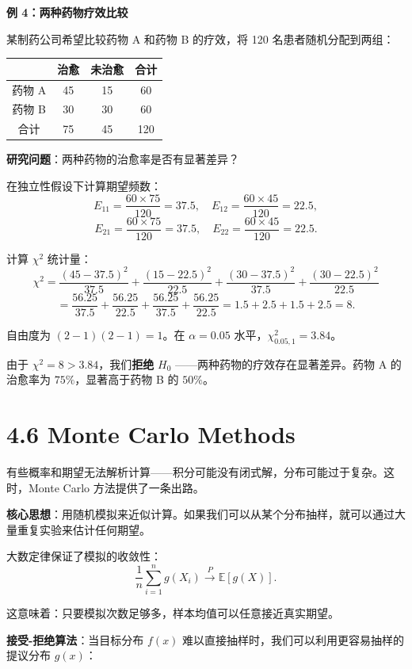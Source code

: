 \textbf{例 4：两种药物疗效比较}

某制药公司希望比较药物 A 和药物 B 的疗效，将 120 名患者随机分配到两组：

\begin{center}
\begin{tabular}{c|cc|c}
\hline
 & 治愈 & 未治愈 & 合计 \\ \hline
药物 A & 45 & 15 & 60 \\
药物 B & 30 & 30 & 60 \\ \hline
合计 & 75 & 45 & 120 \\
\hline
\end{tabular}
\end{center}

\textbf{研究问题}：两种药物的治愈率是否有显著差异？

在独立性假设下计算期望频数：
\[
E_{11} = \frac{60 \times 75}{120} = 37.5, \quad
E_{12} = \frac{60 \times 45}{120} = 22.5,
\]
\[
E_{21} = \frac{60 \times 75}{120} = 37.5, \quad
E_{22} = \frac{60 \times 45}{120} = 22.5.
\]

计算 $\chi^2$ 统计量：
\[
\chi^2 = \frac{(45-37.5)^2}{37.5} + \frac{(15-22.5)^2}{22.5}
+ \frac{(30-37.5)^2}{37.5} + \frac{(30-22.5)^2}{22.5}
\]
\[
= \frac{56.25}{37.5} + \frac{56.25}{22.5} + \frac{56.25}{37.5} + \frac{56.25}{22.5}
= 1.5 + 2.5 + 1.5 + 2.5 = 8.
\]

自由度为 $(2-1)(2-1) = 1$。在 $\alpha = 0.05$ 水平，$\chi^2_{0.05, 1} = 3.84$。

由于 $\chi^2 = 8 > 3.84$，我们\textbf{拒绝} $H_0$ ——两种药物的疗效存在显著差异。药物 A 的治愈率为 $75\%$，显著高于药物 B 的 $50\%$。

\section{4.6 Monte Carlo Methods}\label{sec:4.6}

有些概率和期望无法解析计算——积分可能没有闭式解，分布可能过于复杂。这时，Monte Carlo 方法提供了一条出路。

\textbf{核心思想}：用随机模拟来近似计算。如果我们可以从某个分布抽样，就可以通过大量重复实验来估计任何期望。

大数定律保证了模拟的收敛性：
\[
\frac{1}{n}\sum_{i=1}^n g(X_i) \xrightarrow{P} \mathbb{E}[g(X)].
\label{eq:lln-monte-carlo}\]

这意味着：只要模拟次数足够多，样本均值可以任意接近真实期望。

\textbf{接受-拒绝算法}：当目标分布 $f(x)$ 难以直接抽样时，我们可以利用更容易抽样的提议分布 $g(x)$：

